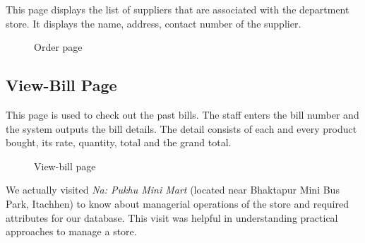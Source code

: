 This page displays the list of suppliers that are associated with the
department store. It displays the name, address, contact number of the
supplier.

\begin{figure}[h!]\centering
  \caption{Order page}\label{fig:order}
\end{figure}

\subsection{View-Bill Page}

This page is used to check out the past bills. The staff enters the bill number
and the system outputs the bill details. The detail consists of each and every
product bought, its rate, quantity, total and the grand total.

\begin{figure}[h!]\centering
  \caption{View-bill page}\label{fig:bill-info}
\end{figure}

We actually visited {\em Na: Pukhu Mini Mart} (located near Bhaktapur Mini Bus
Park, Itachhen) to know about managerial operations of the store and required
attributes for our database. This visit was helpful in understanding practical
approaches to manage a store.

